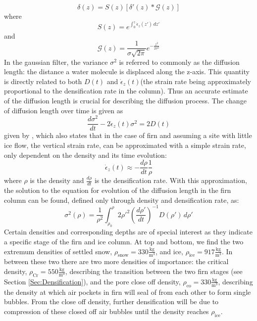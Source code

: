 \documentclass[../../CompleteThesis/Complete_1stDraft.tex]{subfiles}
\begin{document}
\begin{equation}
	\delta(z) = S(z)[\delta'(z)*\mathcal{G}(z)]
	\label{Eq:diff_solution_conv}
\end{equation}
where
\begin{equation}
	S(z) = e^{\int_{0}^{z}\dot{\epsilon}_z(z')\, dz'}
	\label{Eq:Thinning_fct}
\end{equation}
and
\begin{equation}
	\mathcal{G}(z) = \frac{1}{\sigma\sqrt{2\pi}}e^{-\frac{z^2}{2\sigma^2}}
	\label{Eq:Gauss_filter}
\end{equation}
In the gaussian filter, the variance $\sigma^2$ is referred to commonly as the diffusion length: the distance a water molecule is displaced along the z-axis. This quantity is directly related to both $D(t)$ and $\dot{\epsilon}_z(t)$(the strain rate being approximately proportional to the densification rate in the column). Thus an accurate estimate of the diffusion length is crucial for describing the diffusion process.
The change of diffusion length over time is given as 
\begin{equation}
	\frac{d\sigma^2}{dt} - 2\dot{\epsilon}_z (t)\sigma^2 = 2 D(t)
	\label{Eq:Evolution_DiffLen}
\end{equation}
given by \cite[Johnsen, 1977]{Johnsen1977}, which also states that in the case of firn and assuming a site with little ice flow, the vertical strain rate, can be approximated with a simple strain rate, only dependent on the density and its time evolution:
\begin{equation}
	\dot{\epsilon}_z(t) \approx - \frac{d\rho}{dt}\frac{1}{\rho}
	\label{Eq:strain_rate_approx}
\end{equation}
where $\rho$ is the density and $\frac{d\rho}{dt}$ is the densification rate. With this approximation, the solution to the equation for evolution of the diffusion length in the firn column can be found, defined only through density and densification rate, as:
\begin{equation}
	\sigma^2(\rho) =\frac{1}{\rho^2} \int_{\rho_0}^{\rho}2\rho'^2\left(\frac{d\rho'}{dt}\right)^{-1} D(\rho') \, d\rho'
	\label{Eq:Diff_Len_Firn}
\end{equation}
Certain densities and corresponding depths are of special interest as they indicate a specific stage of the firn and ice column. At top and bottom, we find the two extremum densities of settled snow, $\rho_{\text{snow}} = 330 \frac{\text{kg}}{\text{m}^3}$, and ice, $\rho_{\text{ice}} = 917 \frac{\text{kg}}{\text{m}^3}$. In between these two there are two more densities of importance: the critical density, $\rho_{\text{Cr}} = 550 \frac{\text{kg}}{\text{m}^3}$, describing the transition between the two firn stages (see Section \ref{Sec:Densification}), and the pore close off density, $\rho_{\text{co}} = 330 \frac{\text{kg}}{\text{m}^3}$, describing the density at which air pockets in firn will seal of from each other to form single bubbles. From the close off density, further densification will be due to compression of these closed off air bubbles until the density reaches $\rho_{\text{ice}}$.
\end{document}
